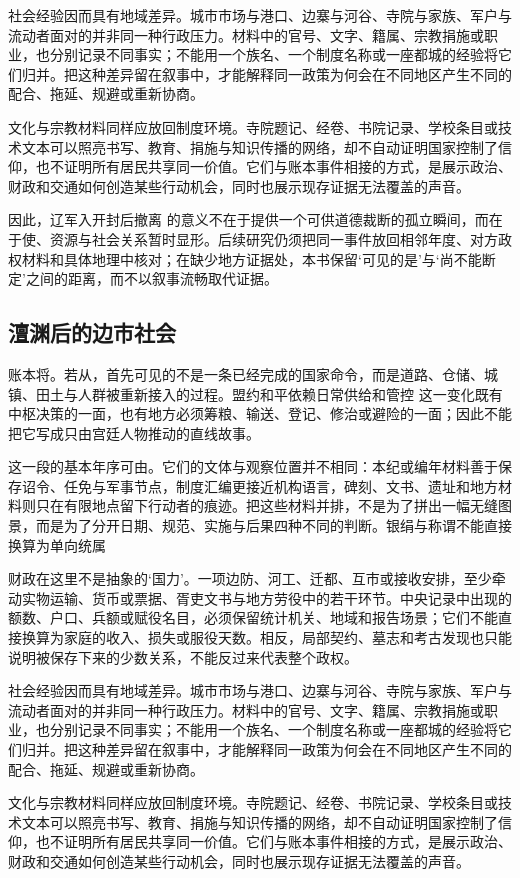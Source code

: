 社会经验因而具有地域差异。城市市场与港口、边寨与河谷、寺院与家族、军户与流动者面对的并非同一种行政压力。材料中的官号、文字、籍属、宗教捐施或职业，也分别记录不同事实；不能用一个族名、一个制度名称或一座都城的经验将它们归并。把这种差异留在叙事中，才能解释同一政策为何会在不同地区产生不同的配合、拖延、规避或重新协商。

文化与宗教材料同样应放回制度环境。寺院题记、经卷、书院记录、学校条目或技术文本可以照亮书写、教育、捐施与知识传播的网络，却不自动证明国家控制了信仰，也不证明所有居民共享同一价值。它们与账本事件相接的方式，是展示政治、财政和交通如何创造某些行动机会，同时也展示现存证据无法覆盖的声音。

因此，辽军入开封后撤离 的意义不在于提供一个可供道德裁断的孤立瞬间，而在于使、资源与社会关系暂时显形。后续研究仍须把同一事件放回相邻年度、对方政权材料和具体地理中核对；在缺少地方证据处，本书保留‘可见的是’与‘尚不能断定’之间的距离，而不以叙事流畅取代证据。

\subsection{澶渊后的边市社会}

账本将。若从，首先可见的不是一条已经完成的国家命令，而是道路、仓储、城镇、田土与人群被重新接入的过程。盟约和平依赖日常供给和管控 这一变化既有中枢决策的一面，也有地方必须筹粮、输送、登记、修治或避险的一面；因此不能把它写成只由宫廷人物推动的直线故事。

这一段的基本年序可由。它们的文体与观察位置并不相同：本纪或编年材料善于保存诏令、任免与军事节点，制度汇编更接近机构语言，碑刻、文书、遗址和地方材料则只在有限地点留下行动者的痕迹。把这些材料并排，不是为了拼出一幅无缝图景，而是为了分开日期、规范、实施与后果四种不同的判断。银绢与称谓不能直接换算为单向统属

财政在这里不是抽象的‘国力’。一项边防、河工、迁都、互市或接收安排，至少牵动实物运输、货币或票据、胥吏文书与地方劳役中的若干环节。中央记录中出现的额数、户口、兵额或赋役名目，必须保留统计机关、地域和报告场景；它们不能直接换算为家庭的收入、损失或服役天数。相反，局部契约、墓志和考古发现也只能说明被保存下来的少数关系，不能反过来代表整个政权。

社会经验因而具有地域差异。城市市场与港口、边寨与河谷、寺院与家族、军户与流动者面对的并非同一种行政压力。材料中的官号、文字、籍属、宗教捐施或职业，也分别记录不同事实；不能用一个族名、一个制度名称或一座都城的经验将它们归并。把这种差异留在叙事中，才能解释同一政策为何会在不同地区产生不同的配合、拖延、规避或重新协商。

文化与宗教材料同样应放回制度环境。寺院题记、经卷、书院记录、学校条目或技术文本可以照亮书写、教育、捐施与知识传播的网络，却不自动证明国家控制了信仰，也不证明所有居民共享同一价值。它们与账本事件相接的方式，是展示政治、财政和交通如何创造某些行动机会，同时也展示现存证据无法覆盖的声音。

